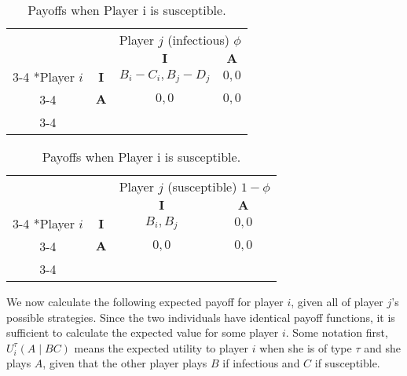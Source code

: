 \documentclass{article}
\theoremstyle{definition}
\theoremstyle{exercise}
\theoremstyle{remark}
\begin{document}
  \begin{table}[H]
      \centering
    \begin{minipage}{.5\textwidth}
    \setlength{\extrarowheight}{2pt}
    \begin{tabular}{cc|c|c|}
        & \multicolumn{1}{c}{} & \multicolumn{2}{c}{Player $j$ (infectious) $\phi$}\\
      & \multicolumn{1}{c}{} & \multicolumn{1}{c}{$\bm{I}$}  & \multicolumn{1}{c}{$\bm{A}$} \\\cline{3-4}
        \multirow{2}*{Player $i$ }  & $\bm{I}$ & $B_i - C_i , B_j - D_j$ & $0,0$ \\\cline{3-4}
        & $\bm{A}$ & $0,0$ & $0,0$ \\\cline{3-4}
    \end{tabular}
    \end{minipage}%
    \begin{minipage}{.5\textwidth}
    \setlength{\extrarowheight}{2pt}
    \begin{tabular}{cc|c|c|}
        & \multicolumn{1}{c}{} & \multicolumn{2}{c}{Player $j$ (susceptible) $1 - \phi$}\\
      & \multicolumn{1}{c}{} & \multicolumn{1}{c}{$\bm{I}$}  & \multicolumn{1}{c}{$\bm{A}$} \\\cline{3-4}
        \multirow{2}*{Player $i$}  & $\bm{I}$ & $B_i, B_j$ & $0,0$ \\\cline{3-4}
        & $\bm{A}$ & $0,0$ & $0,0$ \\\cline{3-4}
    \end{tabular}
    \end{minipage}
      \caption{Payoffs when Player i is susceptible.}
  \end{table}


We now calculate the following expected payoff for player $i$, given all of player $j$'s  possible strategies.
Since the two individuals have identical payoff functions, it is sufficient to calculate the expected value for some player $i$.
Some notation first, $U_i^{\tau}(A \;|\; BC)$ means the expected utility to player $i$ when she is of type $\tau$ and she plays $A$, given that the other player plays $B$ if infectious and $C$ if susceptible.
\end{document}
